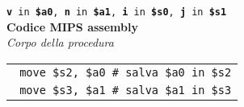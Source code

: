 \documentclass[../main.tex]{subfiles}
\begin{document}
\texttt{\textbf{v} in \textbf{\$a0}, \textbf{n} in \textbf{\$a1}, \textbf{i} in \textbf{\$s0}, \textbf{j} in \textbf{\$s1}}
\\[5mm]
\textbf{Codice MIPS assembly} \\[2mm]
\textit{Corpo della procedura} \\[1mm]
\begin{tabular}{ l }
    \hline
    \hline
    \texttt{\hspace*{0cm} \hspace*{0cm} \hspace*{0cm} \hspace*{0cm} \hspace*{0cm} \hspace*{0cm} \hspace*{0cm} \hspace*{0cm} \hspace*{0cm} move \$s2, \$a0 \hspace*{0cm} \hspace*{0cm} \hspace*{0cm} \hspace*{0cm} \hspace*{0cm} \hspace*{0cm} \hspace*{0cm} \hspace*{0cm} \hspace*{0cm} \# salva \$a0 in \$s2} \\
    \texttt{\hspace*{0cm} \hspace*{0cm} \hspace*{0cm} \hspace*{0cm} \hspace*{0cm} \hspace*{0cm} \hspace*{0cm} \hspace*{0cm} \hspace*{0cm} move \$s3, \$a1 \hspace*{0cm} \hspace*{0cm} \hspace*{0cm} \hspace*{0cm} \hspace*{0cm} \hspace*{0cm} \hspace*{0cm} \hspace*{0cm} \hspace*{0cm} \# salva \$a1 in \$s3} \\
    \hline
    \hline

\end{tabular}
\end{document}
